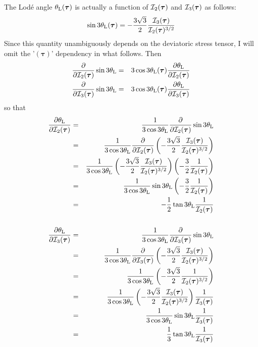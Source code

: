 The Lod\'e angle $\theta_{\rm L}(\bm\tau)$ 
is actually a function of ${\cal I}_2(\bm\tau)$ and ${\cal I}_3(\bm\tau)$ as follows:
\[
\sin 3\theta_{\rm L}(\bm\tau) = 
-\frac{3\sqrt{3}}{2}  \frac{{\cal I}_3(\bm\tau)}{{\cal I}_2(\bm\tau)^{3/2}} 
\]
Since this quantity unambiguously depends on the deviatoric stress tensor, 
I will omit the '$(\bm\tau)$' dependency in what follows.
Then
\begin{eqnarray}
\frac{\partial }{\partial {\cal I}_2(\bm\tau)} \sin 3\theta_{\rm L}
&=&3\cos 3\theta_{\rm L}(\bm\tau)  \frac{\partial \theta_{\rm L}}{\partial {\cal I}_2(\bm\tau)}\nonumber\\
\frac{\partial }{\partial {\cal I}_3(\bm\tau)} \sin 3\theta_{\rm L}
&=&3 \cos 3\theta_{\rm L}(\bm\tau)  \frac{\partial \theta_{\rm L}}{\partial {\cal I}_3(\bm\tau)}\nonumber
\end{eqnarray}
so that 
\begin{eqnarray}
\frac{\partial \theta_{\rm L}}{\partial {\cal I}_2(\bm\tau)}
&=&\frac{1}{3 \cos 3\theta_{\rm L}} 
\frac{\partial }{\partial {\cal I}_2(\bm\tau)} \sin 3\theta_{\rm L}  \nonumber\\
&=&\frac{1}{3 \cos 3\theta_{\rm L}} 
\frac{\partial }{\partial {\cal I}_2(\bm\tau)}
\left(-\frac{3\sqrt{3}}{2}  \frac{{\cal I}_3(\bm\tau)}{{\cal I}_2(\bm\tau)^{3/2}} \right) \nonumber\\
&=&\frac{1}{3 \cos 3\theta_{\rm L}} 
\left(-\frac{3\sqrt{3}}{2}  \frac{{\cal I}_3(\bm\tau)}{{\cal I}_2(\bm\tau)^{3/2}} \right)
\left( -\frac32 \frac{1}{ {\cal I}_2(\bm\tau)}\right) \nonumber\\
&=&\frac{1}{3 \cos 3\theta_{\rm L}} 
\sin 3\theta_{\rm L}
\left( -\frac32 \frac{1}{ {\cal I}_2(\bm\tau)}\right) \nonumber\\
&=& -\frac12 \tan 3\theta_{\rm L} \frac{1}{ {\cal I}_2(\bm\tau)}  
\nonumber\\
\nonumber\\
\frac{\partial \theta_{\rm L}}{\partial {\cal I}_3(\bm\tau)}
&=&\frac{1}{3 \cos 3\theta_{\rm L}} 
\frac{\partial }{\partial {\cal I}_3(\bm\tau)} \sin 3\theta_{\rm L} \nonumber \\
&=&\frac{1}{3 \cos 3\theta_{\rm L}} 
\frac{\partial }{\partial {\cal I}_3(\bm\tau)} 
\left(
-\frac{3\sqrt{3}}{2}  \frac{{\cal I}_3(\bm\tau)}{{\cal I}_2(\bm\tau)^{3/2}} 
\right) \nonumber\\
&=&\frac{1}{3 \cos 3\theta_{\rm L}} 
\left(
-\frac{3\sqrt{3}}{2}  \frac{1}{ {\cal I}_2(\bm\tau)^{3/2}} 
\right) \nonumber\\
&=&\frac{1}{3 \cos 3\theta_{\rm L}} 
\left(
-\frac{3\sqrt{3}}{2}  \frac{{\cal I}_3(\bm\tau)}{{\cal I}_2(\bm\tau)^{3/2}} 
\right)
\frac{1}{{\cal I}_3(\bm\tau)} \nonumber\\
&=&\frac{1}{3 \cos 3\theta_{\rm L}} 
\sin 3 \theta_{\rm L}
\frac{1}{{\cal I}_3(\bm\tau)}\nonumber \\
&=& \frac13 \tan 3\theta_{\rm L} \frac{1}{{\cal I}_3(\bm\tau)} \nonumber
\end{eqnarray}
